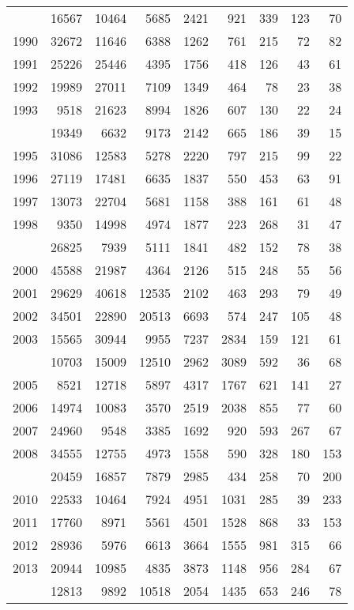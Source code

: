 \documentclass[
]{article}
\begin{document}
\begin{longtable}[t]{lrrrrrrrr}
\endfoot
\bottomrule
\endlastfoot
1989 & 16567 & 10464 & 5685 & 2421 & 921 & 339 & 123 & 70\\
1990 & 32672 & 11646 & 6388 & 1262 & 761 & 215 & 72 & 82\\
1991 & 25226 & 25446 & 4395 & 1756 & 418 & 126 & 43 & 61\\
1992 & 19989 & 27011 & 7109 & 1349 & 464 & 78 & 23 & 38\\
1993 & 9518 & 21623 & 8994 & 1826 & 607 & 130 & 22 & 24\\
\addlinespace
1994 & 19349 & 6632 & 9173 & 2142 & 665 & 186 & 39 & 15\\
1995 & 31086 & 12583 & 5278 & 2220 & 797 & 215 & 99 & 22\\
1996 & 27119 & 17481 & 6635 & 1837 & 550 & 453 & 63 & 91\\
1997 & 13073 & 22704 & 5681 & 1158 & 388 & 161 & 61 & 48\\
1998 & 9350 & 14998 & 4974 & 1877 & 223 & 268 & 31 & 47\\
\addlinespace
1999 & 26825 & 7939 & 5111 & 1841 & 482 & 152 & 78 & 38\\
2000 & 45588 & 21987 & 4364 & 2126 & 515 & 248 & 55 & 56\\
2001 & 29629 & 40618 & 12535 & 2102 & 463 & 293 & 79 & 49\\
2002 & 34501 & 22890 & 20513 & 6693 & 574 & 247 & 105 & 48\\
2003 & 15565 & 30944 & 9955 & 7237 & 2834 & 159 & 121 & 61\\
\addlinespace
2004 & 10703 & 15009 & 12510 & 2962 & 3089 & 592 & 36 & 68\\
2005 & 8521 & 12718 & 5897 & 4317 & 1767 & 621 & 141 & 27\\
2006 & 14974 & 10083 & 3570 & 2519 & 2038 & 855 & 77 & 60\\
2007 & 24960 & 9548 & 3385 & 1692 & 920 & 593 & 267 & 67\\
2008 & 34555 & 12755 & 4973 & 1558 & 590 & 328 & 180 & 153\\
\addlinespace
2009 & 20459 & 16857 & 7879 & 2985 & 434 & 258 & 70 & 200\\
2010 & 22533 & 10464 & 7924 & 4951 & 1031 & 285 & 39 & 233\\
2011 & 17760 & 8971 & 5561 & 4501 & 1528 & 868 & 33 & 153\\
2012 & 28936 & 5976 & 6613 & 3664 & 1555 & 981 & 315 & 66\\
2013 & 20944 & 10985 & 4835 & 3873 & 1148 & 956 & 284 & 67\\
\addlinespace
2014 & 12813 & 9892 & 10518 & 2054 & 1435 & 653 & 246 & 78\\

\end{longtable}
\end{document}
